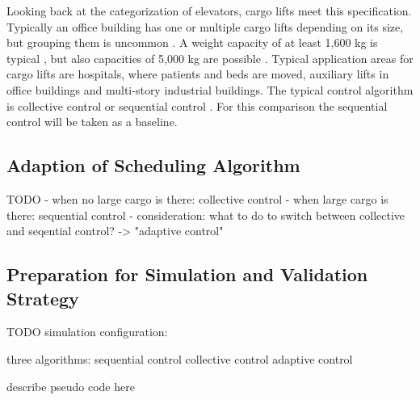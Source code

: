 Looking back at the categorization of elevators, cargo lifts meet this specification.
Typically an office building has one or multiple cargo lifts depending on its size,
but grouping them is uncommon \autocite[][p.~167]{barney2016handbook}.
A weight capacity of at least 1,600 kg is typical \autocite[][p.~167]{barney2016handbook},
but also capacities of 5,000 kg are possible \autocite[][]{kone2017overview}.
Typical application areas for cargo lifts are hospitals, where patients and beds are moved,
auxiliary lifts in office buildings and multi-story industrial buildings.
The typical control algorithm is collective control or sequential control \autocite[][pp.~238,~244]{barney2016handbook}.
For this comparison the sequential control will be taken as a baseline.

\subsection{Adaption of Scheduling Algorithm}
TODO
- when no large cargo is there: collective control
- when large cargo is there: sequential control
- consideration: what to do to switch between collective and seqential control? -> "adaptive control"

\subsection{Preparation for Simulation and Validation Strategy}

TODO simulation configuration:
\autocite[][p.~347]{barney2016handbook}

three algorithms:
sequential control
collective control
adaptive control

describe pseudo code here

